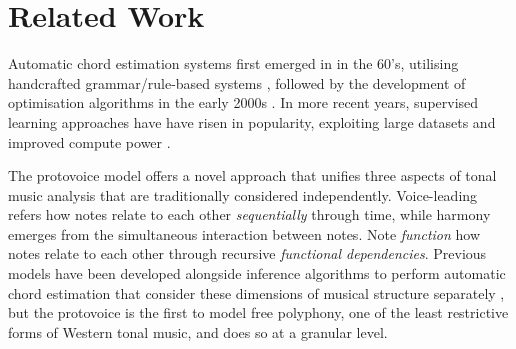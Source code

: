 \documentclass[12pt,a4paper,twoside,openright]{report} \usepackage[pdfborder={0 0 0}]{hyperref}    %
\theoremstyle{definition} \newtheorem{definition}{Definition}[section]
\begin{document}

    \section{Related Work}

    Automatic chord estimation systems first emerged in in the 60's, utilising handcrafted grammar/rule-based systems
    \cite{maxwellExpertSystemHarmonizing1992} \cite{winogradLinguisticsComputerAnalysis1968}, followed by the
    development of optimisation algorithms in the early 2000s \cite{pardoAlgorithmsChordalAnalysis2002}. In more recent
    years, supervised learning approaches have have risen in popularity, exploiting large datasets and improved compute
    power \cite{niEndtoendMachineLearning2011} \cite{mcleodModularSystemHarmonic2021}
    \cite{masadaChordRecognitionSymbolic2018}. \par The protovoice model offers a novel approach that unifies three
    aspects of tonal music analysis that are traditionally considered independently. Voice-leading refers how notes
    relate to each other \textit{sequentially} through time, while harmony emerges from the simultaneous interaction
    between notes. Note \textit{function} how notes relate to each other through recursive \textit{functional
    dependencies}. Previous models have been developed alongside inference algorithms to perform automatic chord
    estimation that consider these dimensions of musical structure separately \cite{maxwellExpertSystemHarmonizing1995}
    \cite{winogradLinguisticsComputerAnalysis1968}, but the protovoice is the first to model free polyphony, one of the
    least restrictive forms of Western tonal music, and does so at a granular level. 


    \par
\end{document}
